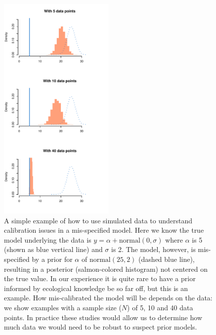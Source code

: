 \documentclass[11pt]{article}
\begin{document}
\begin{figure}[ht]
\centering
\noindent \includegraphics[width=0.5\textwidth]{examples/misspecifiedmodel/priorpostforflows.pdf}
\caption{A simple example of how to use simulated data to understand calibration issues in a mis-specified model. Here we know the true model underlying the data is $y=\alpha + \text{normal}(0, \sigma)$ where $\alpha$ is 5 (shown as blue vertical line) and $\sigma$ is 2. The model, however, is mis-specified by a prior for $\alpha$ of $\text{normal}(25, 2)$ (dashed blue line), resulting in a posterior (salmon-colored histogram) not centered on the true value. In our experience it is quite rare to have a prior informed by ecological knowledge be so far off, but this is an example. How mis-calibrated the model will be depends on the data: we show examples with a sample size ($N$) of 5, 10 and 40 data points. In practice these studies would allow us to determine how much data we would need to be robust to suspect prior models. }
\label{fig:misspecifyprior}
\end{figure}
\end{document}
